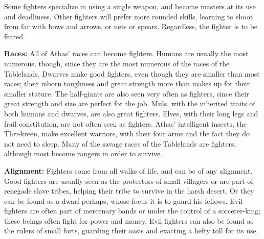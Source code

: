 Some fighters specialize in using a single weapon, and become masters at its use and deadliness. Other fighters will prefer more rounded skills, learning to shoot from far with bows and arrows, or nets or spears. Regardless, the fighter is to be feared.

\textbf{Races:} All of Athas' races can become fighters. Humans are usually the most numerous, though, since they are the most numerous of the races of the Tablelands. Dwarves make good fighters, even though they are smaller than most races; their inborn toughness and great strength more than makes up for their smaller stature. The half-giants are also seen very often as fighters, since their great strength and size are perfect for the job. Muls, with the inherited traits of both humans and dwarves, are also great fighters. Elves, with their long legs and frail constitution, are not often seen as fighters. Athas' intelligent insects, the Thri-kreen, make excellent warriors, with their four arms and the fact they do not need to sleep. Many of the savage races of the Tablelands are fighters, although most become rangers in order to survive.

\textbf{Alignment:} Fighters come from all walks of life, and can be of any alignment. Good fighters are usually seen as the protectors of small villagers or are part of renegade slave tribes, helping their tribe to survive in the harsh desert. Or they can be found as a dwarf perhaps, whose focus it is to guard his fellows. Evil fighters are often part of mercenary bands or under the control of a sorcerer-king; these beings often fight for power and money. Evil fighters can also be found as the rulers of small forts, guarding their oasis and exacting a hefty toll for its use.

